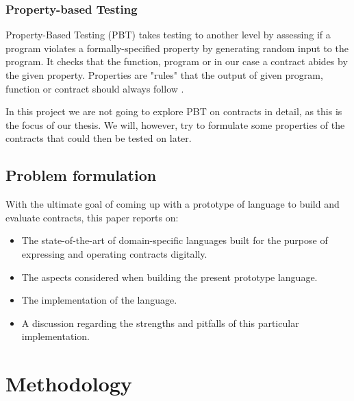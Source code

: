 \documentclass{ituthesis}
\begin{document}
\subsection{Property-based Testing} %
Property-Based Testing (PBT) takes testing to another level by assessing if a program violates a formally-specified property by generating random input to the program. It checks that the function, program or in our case a contract abides by the given property. Properties are "rules" that the output of given program, function or contract should always follow \cite{fink1994towards}.

In this project we are not going to explore PBT on contracts in detail, as this is the focus of our thesis. We will, however, try to formulate some properties of the contracts that could then be tested on later.

\section{Problem formulation} %
With the ultimate goal of coming up with a prototype of language to build and evaluate contracts, this paper reports on:
\begin{itemize}
    \item The state-of-the-art of domain-specific languages built for the purpose of expressing and operating contracts digitally.
    \item The aspects considered when building the present prototype language.
    \item The implementation of the language.
    \item A discussion regarding the strengths and pitfalls of this particular implementation.
\end{itemize}

\chapter{Methodology}
\end{document}
